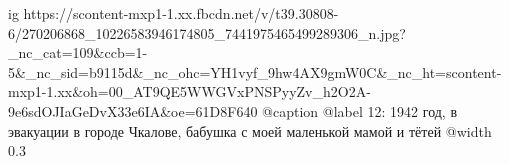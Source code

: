  
 
 
 
 

\ifcmt
  ig https://scontent-mxp1-1.xx.fbcdn.net/v/t39.30808-6/270206868_10226583946174805_7441975465499289306_n.jpg?_nc_cat=109&ccb=1-5&_nc_sid=b9115d&_nc_ohc=YH1vyf_9hw4AX9gmW0C&_nc_ht=scontent-mxp1-1.xx&oh=00_AT9QE5WWGVxPNSPyyZv_h2O2A-9e6sdOJIaGeDvX33e6IA&oe=61D8F640
	@caption @label 12: 1942 год, в эвакуации в городе Чкалове, бабушка с моей маленькой мамой и тётей
  @width 0.3
\fi
